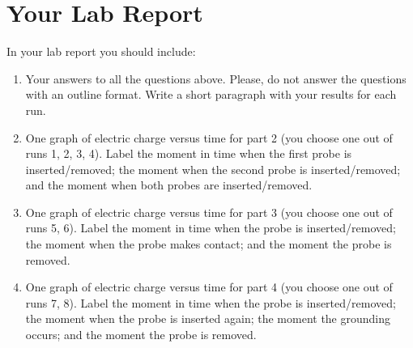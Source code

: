 \section{Your Lab Report}
In your lab report you should include:
\begin{enumerate}
	\item Your answers to all the questions above. Please, do not answer the questions with an outline format. Write a short paragraph with your results for each run.
	\item One graph of electric charge versus time for part 2 (you choose one out of runs 1, 2, 3, 4). Label the moment in time when the first probe is inserted/removed; the moment when the second probe is inserted/removed; and the moment when both probes are inserted/removed.
	\item One graph of electric charge versus time for part 3 (you choose one out of runs 5, 6). Label the moment in time when the probe is inserted/removed; the moment when the probe makes contact; and the moment the probe is removed.
	\item One graph of electric charge versus time for part 4 (you choose one out of runs 7, 8). Label the moment in time when the probe is inserted/removed; the moment when the probe is inserted again; the moment the grounding occurs; and the moment the probe is removed.
\end{enumerate}